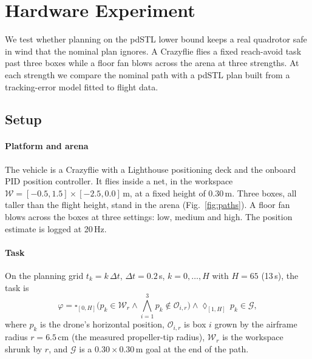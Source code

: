 
\section{Hardware Experiment}
\label{sec:hardware}

We test whether planning on the pdSTL lower bound keeps a real quadrotor
safe in wind that the nominal plan ignores. A Crazyflie flies a fixed
reach-avoid task past three boxes while a floor fan blows across the
arena at three strengths. At each strength we compare the nominal path
with a pdSTL plan built from a tracking-error model fitted to flight data.

\subsection{Setup}

\paragraph{Platform and arena}
The vehicle is a Crazyflie %
with a Lighthouse positioning deck and the onboard PID position controller.
It flies inside a net, in the workspace
$\mathcal{W} = [-0.5, 1.5] \times [-2.5, 0.0]$\,m, at a fixed height of
0.30\,m. Three boxes, all taller than the flight height, stand in the
arena (Fig.~\ref{fig:paths}). A floor fan
blows across the boxes at three settings: low, medium and high. The
position estimate is logged at 20\,Hz.

\paragraph{Task}
On the planning grid $t_k = k\,\Delta t$, $\Delta t = 0.2$\,s,
$k = 0,\dots,H$ with $H = 65$ (13\,s), the task is
\begin{equation}
  \varphi = \square_{[0,H]}\Big(p_k \in \mathcal{W}_r
    \wedge \textstyle\bigwedge_{i=1}^{3} p_k \notin \mathcal{O}_{i,r}\Big)
  \wedge \lozenge_{[1,H]}\, p_k \in \mathcal{G},
  \label{eq:hw-task}
\end{equation}
where $p_k$ is the drone's horizontal position, $\mathcal{O}_{i,r}$ is box
$i$ grown by the airframe radius $r = 6.5$\,cm (the measured propeller-tip
radius), $\mathcal{W}_r$ is the workspace shrunk by $r$, and $\mathcal{G}$
is a $0.30 \times 0.30$\,m goal at the end of the path.

